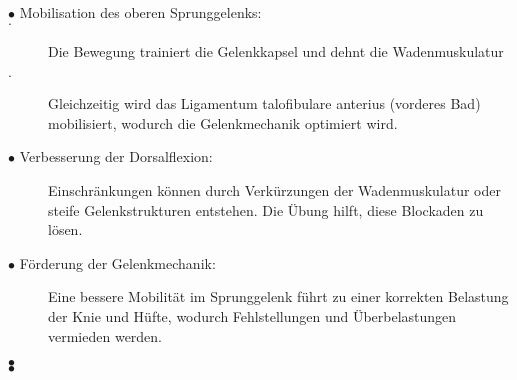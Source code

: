 \begin{description}
    \item[$\bullet$ Mobilisation des oberen Sprunggelenks:]
        \item[$\cdot$]Die Bewegung trainiert die Gelenkkapsel und dehnt die Wadenmuskulatur
        \item[$\cdot$]Gleichzeitig wird das Ligamentum talofibulare anterius (vorderes Bad) mobilisiert, wodurch die Gelenkmechanik optimiert wird.
    \item[$\bullet$ Verbesserung der Dorsalflexion:] Einschränkungen können durch Verkürzungen der Wadenmuskulatur oder steife Gelenkstrukturen entstehen. Die Übung hilft, diese Blockaden zu lösen.
    \item[$\bullet$ Förderung der Gelenkmechanik:] Eine bessere Mobilität im Sprunggelenk führt zu einer korrekten Belastung der Knie und Hüfte, wodurch Fehlstellungen und Überbelastungen vermieden werden.
    \item[$\bullet$]
    \item[$\bullet$]
\end{description}








